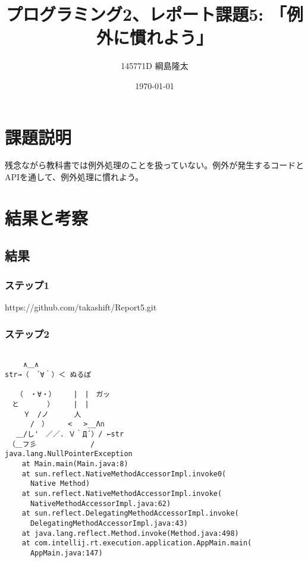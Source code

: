 \documentclass[12pt]{jsarticle}
\begin{document}
\title{プログラミング2、レポート課題5: 「例外に慣れよう」}
\date{\today}
\author{145771D 綱島隆太}
\maketitle

\section{課題説明}

\large
残念ながら教科書では例外処理のことを扱っていない。例外が発生するコードとAPIを通して、例外処理に慣れよう。


\section{結果と考察}
\subsection{結果}
\subsubsection{ステップ1}
https://github.com/takashift/Report5.git

\subsubsection{ステップ2}

 \begin{shadebox}
\begin{verbatim}

　　 ∧＿∧
str→（　´∀｀）＜ ぬるぽ

　 （　・∀・）　　　|　|　ガッ
　と　　　　）　 　 |　|
　　 Ｙ　/ノ　　　 人
　　　 /　）　 　 < 　>__Λ∩
　 ＿/し'　／／. Ｖ｀Д´）/ ←str
　（＿フ彡　　　　　 　　/
java.lang.NullPointerException
	at Main.main(Main.java:8)
	at sun.reflect.NativeMethodAccessorImpl.invoke0(
	  Native Method)
	at sun.reflect.NativeMethodAccessorImpl.invoke(
	  NativeMethodAccessorImpl.java:62)
	at sun.reflect.DelegatingMethodAccessorImpl.invoke(
	  DelegatingMethodAccessorImpl.java:43)
	at java.lang.reflect.Method.invoke(Method.java:498)
	at com.intellij.rt.execution.application.AppMain.main(
	  AppMain.java:147)

\end{verbatim}
\end{shadebox}
\vspace{20pt}
\end{document}
